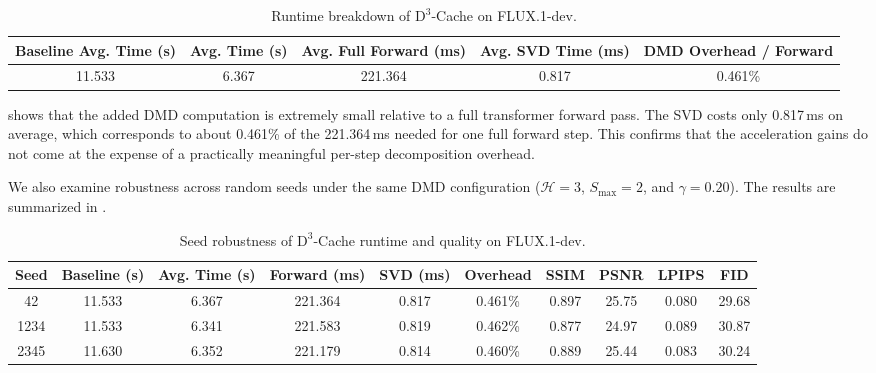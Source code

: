 \begin{table}[H]
\centering
\begingroup
\setlength{\tabcolsep}{0.42em}
\renewcommand{\arraystretch}{1.06}
\begin{tabular}{ccccc}
\toprule
\textbf{Baseline Avg. Time (s)}
    & \textbf{Avg. Time (s)}
    & \textbf{Avg. Full Forward (ms)}
    & \textbf{Avg. SVD Time (ms)}
    & \textbf{DMD Overhead / Forward} \\
\midrule
11.533
    & 6.367
    & 221.364
    & 0.817
    & 0.461\% \\
\bottomrule
\end{tabular}
\endgroup
\caption{Runtime breakdown of $\mathrm{D}^3$-Cache on FLUX.1-dev.}
\label{tab:app:dmd-runtime-breakdown}
\end{table}

shows that the added DMD computation is extremely small
relative to a full transformer forward pass.
The SVD costs only 0.817\,ms on average,
which corresponds to about 0.461\%
of the 221.364\,ms needed for one full forward step.
This confirms that the acceleration gains do not come
at the expense of a practically meaningful per-step decomposition overhead.

We also examine robustness across random seeds
under the same DMD configuration
(\(\mathcal{H}=3\), \(S_{\max}=2\), and \(\gamma=0.20\)).
The results are summarized in .

\begin{table}[H]
\centering
\begingroup
\setlength{\tabcolsep}{0.34em}
\renewcommand{\arraystretch}{1.05}
\begin{tabular}{cccccccccc}
\toprule
\textbf{Seed}
    & \textbf{Baseline (s)}
    & \textbf{Avg. Time (s)}
    & \textbf{Forward (ms)}
    & \textbf{SVD (ms)}
    & \textbf{Overhead}
    & \textbf{SSIM}
    & \textbf{PSNR}
    & \textbf{LPIPS}
    & \textbf{FID} \\
\midrule
42
    & 11.533
    & 6.367
    & 221.364
    & 0.817
    & 0.461\%
    & 0.897
    & 25.75
    & 0.080
    & 29.68 \\
1234
    & 11.533
    & 6.341
    & 221.583
    & 0.819
    & 0.462\%
    & 0.877
    & 24.97
    & 0.089
    & 30.87 \\
2345
    & 11.630
    & 6.352
    & 221.179
    & 0.814
    & 0.460\%
    & 0.889
    & 25.44
    & 0.083
    & 30.24 \\
\bottomrule
\end{tabular}
\endgroup
\caption{Seed robustness of $\mathrm{D}^3$-Cache runtime and quality on FLUX.1-dev.}
\label{tab:app:dmd-runtime-seeds}
\end{table}

